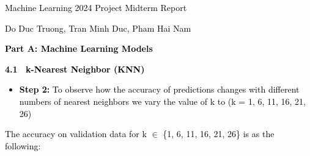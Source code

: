 \documentclass[letterpaper]{article}
\author{Pham Hai Nam}
\date{2024-10-18}
\begin{document}
\clearpage
\pagestyle{Standard}
{\centering
\textcolor{black}{Machine Learning 2024 Project Midterm Report}
\par}

{\centering
\textcolor{black}{Do Duc Truong, Tran Minh Duc, Pham Hai Nam}
\par}


\bigskip

\textbf{\textcolor{black}{Part A: Machine Learning Models }}

\textbf{\textcolor{black}{4.1  k-Nearest Neighbor (KNN)}}\textbf{\textcolor{black}{\ \ }}\textbf{\textcolor{black}{
}}\textbf{\textcolor{black}{\ \ }}\textbf{\textcolor{black}{
}}\textbf{\textcolor{black}{\ \ }}\textbf{\textcolor{black}{ }}\textbf{\textcolor{black}{\ \ \ \ }}

\begin{itemize}[series=listWWNumi,label=[F0B7?]]
\item \textbf{\textcolor{black}{Step 2:}}\textcolor{black}{ To observe how the accuracy of predictions changes with
different numbers of nearest neighbors we vary the value of k to (k = 1, 6, 11, 16, 21, 26) }\newline

\end{itemize}
\textcolor{black}{The accuracy on validation data for k ${\in}$ \{1, 6, 11, 16, 21, 26\} is as the following: }

\centering
{}
\par

\bigskip
\end{document}
